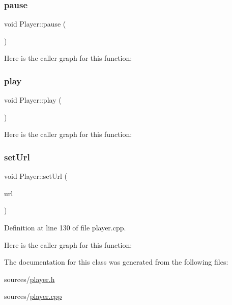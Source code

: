 \mbox{\label{class_player_aa7749254cf909d029127d4622670c522}} 
\subsubsection{\texorpdfstring{pause}{pause}}
{\footnotesize\ttfamily void Player\+::pause (\begin{DoxyParamCaption}{ }\end{DoxyParamCaption})\hspace{0.3cm}{\ttfamily [signal]}}

Here is the caller graph for this function\+:
\mbox{\label{class_player_a8cd819ec3812c26e038e74426bc2b90f}} 
\subsubsection{\texorpdfstring{play}{play}}
{\footnotesize\ttfamily void Player\+::play (\begin{DoxyParamCaption}{ }\end{DoxyParamCaption})\hspace{0.3cm}{\ttfamily [signal]}}

Here is the caller graph for this function\+:
\mbox{\label{class_player_a85dda573e6b2b5f4f7bdf930b0c496f4}} 
\subsubsection{\texorpdfstring{set\+Url}{setUrl}}
{\footnotesize\ttfamily void Player\+::set\+Url (\begin{DoxyParamCaption}\item[{const Q\+Url \&}]{url }\end{DoxyParamCaption})\hspace{0.3cm}{\ttfamily [slot]}}



Definition at line 130 of file player.\+cpp.

Here is the caller graph for this function\+:


The documentation for this class was generated from the following files\+:\begin{DoxyCompactItemize}
\item 
sources/\mbox{\hyperlink{player_8h}{player.\+h}}\item 
sources/\mbox{\hyperlink{player_8cpp}{player.\+cpp}}\end{DoxyCompactItemize}
